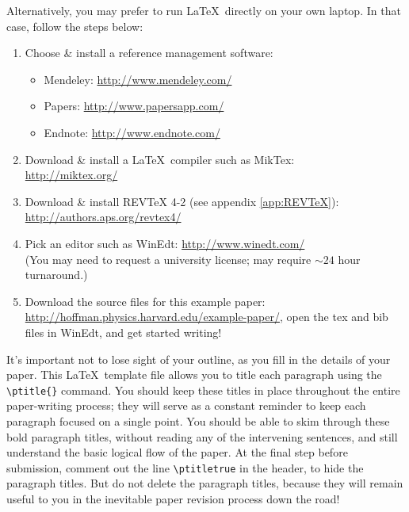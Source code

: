  Alternatively, you may prefer to run \LaTeX\ directly on your own laptop. In that case, follow the steps below:
\begin{raggedright}
\begin{enumerate}
\item Choose \& install a reference management software:
\begin{itemize}
\item Mendeley: \url{http://www.mendeley.com/}
\item Papers: \url{http://www.papersapp.com/}
\item Endnote: \url{http://www.endnote.com/}
\end{itemize}
\item Download \& install a \LaTeX\ compiler such as MikTex: \\
\url{http://miktex.org/}
\item Download \& install REVTeX 4-2 (see appendix \ref{app:REVTeX}):\\
\url{http://authors.aps.org/revtex4/}
\item Pick an editor such as WinEdt:
\url{http://www.winedt.com/}\\
(You may need to request a university license; may require $\sim 24$ hour turnaround.)
\item Download the source files for this example paper:
\url{http://hoffman.physics.harvard.edu/example-paper/}, open the tex and bib files in WinEdt, and get started writing!
\end{enumerate}
\end{raggedright}
\vspace{2mm}

 It's important not to lose sight of your outline, as you fill in the details of your paper. This \LaTeX\ template file allows you to title each paragraph using the {\tt \textbackslash ptitle\{\}} command. You should keep these titles in place throughout the entire paper-writing process; they will serve as a constant reminder to keep each paragraph focused on a single point. You should be able to skim through these bold paragraph titles, without reading any of the intervening sentences, and still understand the basic logical flow of the paper. At the final step before submission, comment out the line {\tt \textbackslash ptitletrue} in the header, to hide the paragraph titles. But do not delete the paragraph titles, because they will remain useful to you in the inevitable paper revision process down the road!
